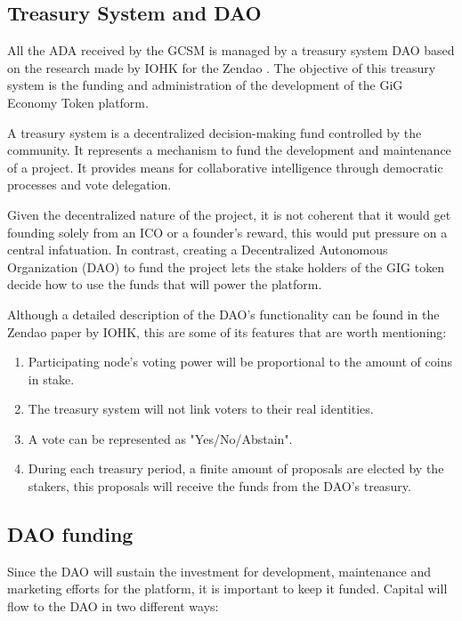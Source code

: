 \documentclass{article}
\begin{document}
\subsection{Treasury System and DAO}

All the ADA received by the GCSM is managed by a treasury system DAO based on the research made by IOHK for the Zendao \cite{zhangb2}. The objective of this treasury system is the funding and administration of the development of the GiG Economy Token platform.

A treasury system is a decentralized decision-making fund controlled by the community. It represents a mechanism to fund the development and maintenance of a project. It provides means for collaborative intelligence through democratic processes and vote delegation.

Given the decentralized nature of the project, it is not coherent that it would get founding solely from an ICO or a founder's reward, this would put pressure on a central infatuation. In contrast, creating a Decentralized Autonomous Organization (DAO) to fund the project lets the stake holders of the GIG token decide how to use the funds that will power the platform.

Although a detailed description of the DAO's functionality can be found in the Zendao paper by IOHK, this are some of its features that are worth mentioning:

\begin{enumerate}

  \item Participating node's voting power will be proportional to the amount of coins in stake.
  \item The treasury system will not link voters to their real identities.
  \item A vote can be represented as "Yes/No/Abstain".
  \item During each treasury period, a finite amount of proposals are elected by the stakers, this proposals will receive the funds from the DAO's treasury.

\end{enumerate}


\subsection{DAO funding}

Since the DAO will sustain the investment for development, maintenance and marketing efforts for the platform, it is important to keep it funded. Capital will flow to the DAO in two different ways:
\end{document}
